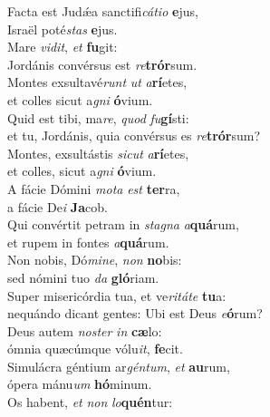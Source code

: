 \evenverse Facta est Judǽa sanctifi\textit{cá}\textit{ti}\textit{o} \textbf{e}jus,~\*\\
\evenverse Israël poté\textit{stas} \textbf{e}jus.\\
\oddverse Mare \textit{vi}\textit{dit}, \textit{et} \textbf{fu}git:~\*\\
\oddverse Jordánis convérsus est \textit{re}\textbf{trór}sum.\\
\evenverse Montes exsultavé\textit{runt} \textit{ut} \textit{a}\textbf{rí}etes,~\*\\
\evenverse et colles sicut a\textit{gni} \textbf{ó}vium.\\
\oddverse Quid est tibi, ma\textit{re}, \textit{quod} \textit{fu}\textbf{gí}sti:~\*\\
\oddverse et tu, Jordánis, quia convérsus es \textit{re}\textbf{trór}sum?\\
\evenverse Montes, exsultástis \textit{si}\textit{cut} \textit{a}\textbf{rí}etes,~\*\\
\evenverse et colles, sicut a\textit{gni} \textbf{ó}vium.\\
\oddverse A fácie Dómini \textit{mo}\textit{ta} \textit{est} \textbf{ter}ra,~\*\\
\oddverse a fácie De\textit{i} \textbf{Ja}cob.\\
\evenverse Qui convértit petram in \textit{sta}\textit{gna} \textit{a}\textbf{quá}rum,~\*\\
\evenverse et rupem in fontes \textit{a}\textbf{quá}rum.\\
\oddverse Non nobis, Dó\textit{mi}\textit{ne}, \textit{non} \textbf{no}bis:~\*\\
\oddverse sed nómini tuo \textit{da} \textbf{gló}riam.\\
\evenverse Super misericórdia tua, et ve\textit{ri}\textit{tá}\textit{te} \textbf{tu}a:~\*\\
\evenverse nequándo dicant gentes: Ubi est Deus \textit{e}\textbf{ó}rum?\\
\oddverse Deus autem \textit{no}\textit{ster} \textit{in} \textbf{cæ}lo:~\*\\
\oddverse ómnia quæcúmque vólu\textit{it}, \textbf{fe}cit.\\
\evenverse Simulácra géntium ar\textit{gén}\textit{tum}, \textit{et} \textbf{au}rum,~\*\\
\evenverse ópera mánu\textit{um} \textbf{hó}minum.\\
\oddverse Os habent, \textit{et} \textit{non} \textit{lo}\textbf{quén}tur:~\*\\
